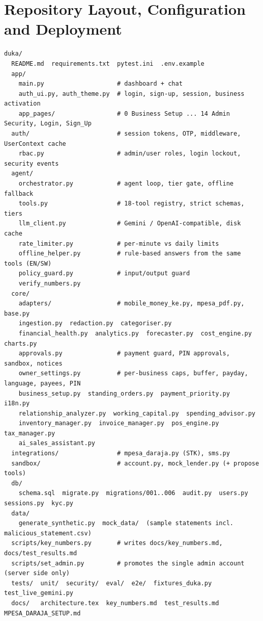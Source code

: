 \documentclass[10pt,a4paper]{article}
\begin{document}
\section{Repository Layout, Configuration and Deployment}
\label{sec:repo}

\begin{lstlisting}[caption={Repository structure as built (main items)}]
duka/
  README.md  requirements.txt  pytest.ini  .env.example
  app/
    main.py                    # dashboard + chat
    auth_ui.py, auth_theme.py  # login, sign-up, session, business activation
    app_pages/                 # 0 Business Setup ... 14 Admin Security, Login, Sign_Up
  auth/                        # session tokens, OTP, middleware, UserContext cache
    rbac.py                    # admin/user roles, login lockout, security events
  agent/
    orchestrator.py            # agent loop, tier gate, offline fallback
    tools.py                   # 18-tool registry, strict schemas, tiers
    llm_client.py              # Gemini / OpenAI-compatible, disk cache
    rate_limiter.py            # per-minute vs daily limits
    offline_helper.py          # rule-based answers from the same tools (EN/SW)
    policy_guard.py            # input/output guard
    verify_numbers.py
  core/
    adapters/                  # mobile_money_ke.py, mpesa_pdf.py, base.py
    ingestion.py  redaction.py  categoriser.py
    financial_health.py  analytics.py  forecaster.py  cost_engine.py  charts.py
    approvals.py               # payment guard, PIN approvals, sandbox, notices
    owner_settings.py          # per-business caps, buffer, payday, language, payees, PIN
    business_setup.py  standing_orders.py  payment_priority.py  i18n.py
    relationship_analyzer.py  working_capital.py  spending_advisor.py
    inventory_manager.py  invoice_manager.py  pos_engine.py  tax_manager.py
    ai_sales_assistant.py
  integrations/                # mpesa_daraja.py (STK), sms.py
  sandbox/                     # account.py, mock_lender.py (+ propose tools)
  db/
    schema.sql  migrate.py  migrations/001..006  audit.py  users.py  sessions.py  kyc.py
  data/
    generate_synthetic.py  mock_data/  (sample statements incl. malicious_statement.csv)
  scripts/key_numbers.py       # writes docs/key_numbers.md, docs/test_results.md
  scripts/set_admin.py         # promotes the single admin account (server side only)
  tests/  unit/  security/  eval/  e2e/  fixtures_duka.py  test_live_gemini.py
  docs/   architecture.tex  key_numbers.md  test_results.md  MPESA_DARAJA_SETUP.md
\end{lstlisting}
\end{document}
